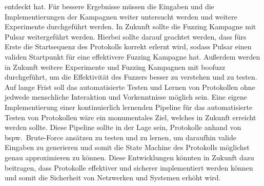 entdeckt hat.
Für bessere Ergebnisse müssen die Eingaben und die Implementierungen der Kampagnen weiter untersucht werden und weitere
Experimente durchgeführt werden.\newline\newline
In Zukunft sollte die Fuzzing Kampagne mit Pulsar weitergeführt werden.
Hierbei sollte darauf geachtet werden, dass fürs Erste die Startsequenz des Protokolls korrekt erlernt wird, sodass Pulsar
einen validen Startpunkt für eine effektivere Fuzzing Kampagne hat.
Außerdem werden in Zukunft weitere Experimente und Fuzzing Kampagnen mit boofuzz durchgeführt, um die Effektivität des
Fuzzers besser zu verstehen und zu testen.
Auf lange Frist soll das automatisierte Testen und Lernen von Protokollen ohne jedwede menschliche Interaktion und
Vorkenntnisse möglich sein.
Eine eigene Implementierung einer kontinuierlich lernenden Pipeline für das automatisierte Testen von Protokollen wäre
ein monumentales Ziel, welches in Zukunft erreicht werden sollte.
Diese Pipeline sollte in der Lage sein, Protokolle anhand von bspw.\ Brute-Force ansätzen zu testen und zu lernen, um
daraufhin valide Eingaben zu generieren und somit die State Machine des Protokolls möglichst genau approximieren zu können.
Diese Entwicklungen könnten in Zukunft dazu beitragen, dass Protokolle effektiver und sicherer implementiert werden können
und somit die Sicherheit von Netzwerken und Systemen erhöht wird.